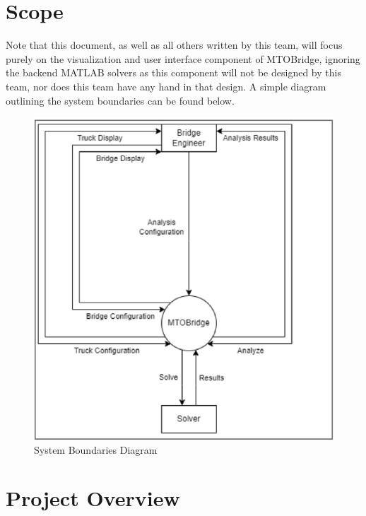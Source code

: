 \documentclass[12pt, titlepage]{article}
\begin{document}
\section{Scope}
Note that this document, as well as all others written by this team, will focus purely on the visualization and user interface component of MTOBridge, ignoring the backend MATLAB solvers as this component will not be designed by this team, nor does this team have any hand in that design. A simple diagram outlining the system boundaries can be found below.
\begin{figure}[H]
  \centering
  \includegraphics[]{../images/system-boundaries.PNG}
  \caption{System Boundaries Diagram}
  \label{fig:system-boundaries-diagram}
\end{figure}

\section{Project Overview}
\end{document}

